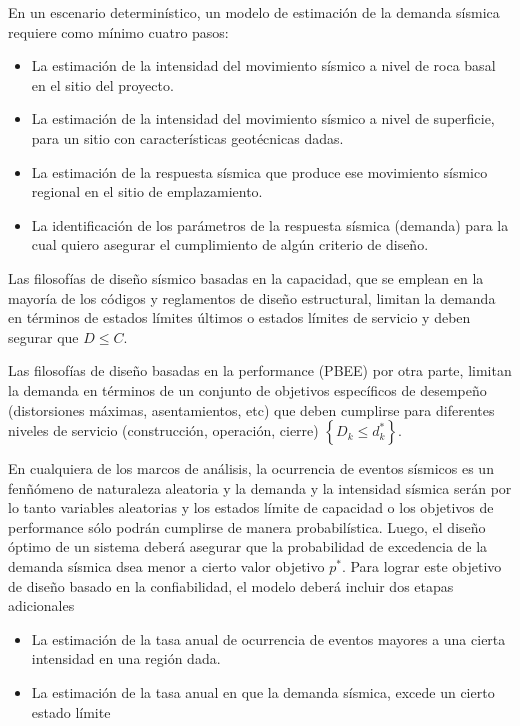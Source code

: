 \documentclass[
]{krantz}
\providecommand{\tightlist}{%
  \setlength{\itemsep}{0pt}\setlength{\parskip}{0pt}}
\begin{document}
En un escenario determinístico, un modelo de estimación de la demanda sísmica requiere como mínimo cuatro pasos:

\begin{itemize}
\tightlist
\item
  La estimación de la intensidad del movimiento sísmico a nivel de roca basal en el sitio del proyecto.
\item
  La estimación de la intensidad del movimiento sísmico a nivel de superficie, para un sitio con características geotécnicas dadas.
\item
  La estimación de la respuesta sísmica que produce ese movimiento sísmico regional en el sitio de emplazamiento.
\item
  La identificación de los parámetros de la respuesta sísmica (demanda) para la cual quiero asegurar el cumplimiento de algún criterio de diseño.
\end{itemize}

Las filosofías de diseño sísmico basadas en la capacidad, que se emplean en la mayoría de los códigos y reglamentos de diseño estructural, limitan la demanda en términos de estados límites últimos o estados límites de servicio y deben segurar que \(D \leq C\).

Las filosofías de diseño basadas en la performance (PBEE) por otra parte, limitan la demanda en términos de un conjunto de objetivos específicos de desempeño (distorsiones máximas, asentamientos, etc) que deben cumplirse para diferentes niveles de servicio (construcción, operación, cierre) \(\left\{ D_{k}\leq d^{\ast }_{k}\right\}\).

En cualquiera de los marcos de análisis, la ocurrencia de eventos sísmicos es un fenñómeno de naturaleza aleatoria y la demanda y la intensidad sísmica serán por lo tanto variables aleatorias y los estados límite de capacidad o los objetivos de performance sólo podrán cumplirse de manera probabilística. Luego, el diseño óptimo de un sistema deberá asegurar que la probabilidad de excedencia de la demanda sísmica dsea menor a cierto valor objetivo \(p^*\). Para lograr este objetivo de diseño basado en la confiabilidad, el modelo deberá incluir dos etapas adicionales

\begin{itemize}
\tightlist
\item
  La estimación de la tasa anual de ocurrencia de eventos mayores a una cierta intensidad en una región dada.
\item
  La estimación de la tasa anual en que la demanda sísmica, excede un cierto estado límite
\end{itemize}
\end{document}
